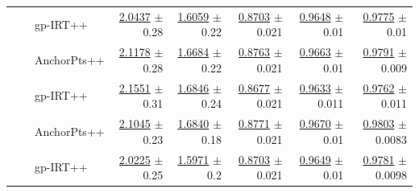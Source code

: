 \begin{longtable}{llp{}rrrrr}
 &  & gp-IRT++ & \underline{2.0437} {\scriptsize $\pm$ 0.28} & \underline{1.6059} {\scriptsize $\pm$ 0.22} & \underline{0.8703} {\scriptsize $\pm$ 0.021} & \underline{0.9648} {\scriptsize $\pm$ 0.01} & \underline{0.9775} {\scriptsize $\pm$ 0.01} \\
 &  & AnchorPts++ & \underline{2.1178} {\scriptsize $\pm$ 0.28} & \underline{1.6684} {\scriptsize $\pm$ 0.22} & \underline{0.8763} {\scriptsize $\pm$ 0.021} & \underline{0.9663} {\scriptsize $\pm$ 0.01} & \underline{0.9791} {\scriptsize $\pm$ 0.009} \\
 &  & gp-IRT++ & \underline{2.1551} {\scriptsize $\pm$ 0.31} & \underline{1.6846} {\scriptsize $\pm$ 0.24} & \underline{0.8677} {\scriptsize $\pm$ 0.021} & \underline{0.9633} {\scriptsize $\pm$ 0.011} & \underline{0.9762} {\scriptsize $\pm$ 0.011} \\
 &  & AnchorPts++ & \underline{2.1045} {\scriptsize $\pm$ 0.23} & \underline{1.6840} {\scriptsize $\pm$ 0.18} & \underline{0.8771} {\scriptsize $\pm$ 0.021} & \underline{0.9670} {\scriptsize $\pm$ 0.01} & \underline{0.9803} {\scriptsize $\pm$ 0.0083} \\
 &  & gp-IRT++ & \underline{2.0225} {\scriptsize $\pm$ 0.25} & \underline{1.5971} {\scriptsize $\pm$ 0.2} & \underline{0.8703} {\scriptsize $\pm$ 0.021} & \underline{0.9649} {\scriptsize $\pm$ 0.01} & \underline{0.9781} {\scriptsize $\pm$ 0.0098} \\
\end{longtable}